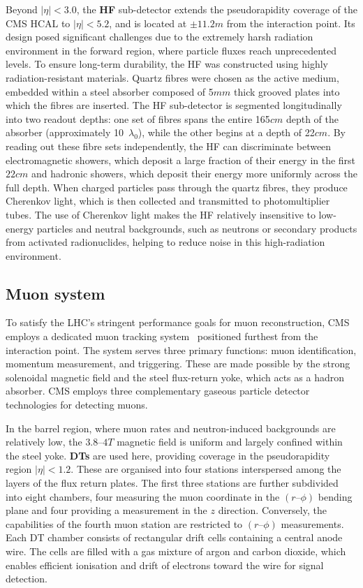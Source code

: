 Beyond $|\eta| < 3.0$, the \textbf{HF} sub-detector extends the pseudorapidity coverage of the CMS HCAL to $|\eta| < 5.2$, and is located at $\pm 11.2\unit{m}$ from the interaction point. Its design posed significant challenges due to the extremely harsh radiation environment in the forward region, where particle fluxes reach unprecedented levels. To ensure long-term durability, the HF was constructed using highly radiation-resistant materials. Quartz fibres were chosen as the active medium, embedded within a steel absorber composed of 5$\unit{mm}$ thick grooved plates into which the fibres are inserted. The HF sub-detector is segmented longitudinally into two readout depths: one set of fibres spans the entire 165$\unit{cm}$ depth of the absorber (approximately 10~$\lambda_0$), while the other begins at a depth of 22$\unit{cm}$. By reading out these fibre sets independently, the HF can discriminate between electromagnetic showers, which deposit a large fraction of their energy in the first $22\unit{cm}$ and hadronic showers, which deposit their energy more uniformly across the full depth. When charged particles pass through the quartz fibres, they produce Cherenkov light, which is then collected and transmitted to photomultiplier tubes. The use of Cherenkov light makes the HF relatively insensitive to low-energy particles and neutral backgrounds, such as neutrons or secondary products from activated radionuclides, helping to reduce noise in this high-radiation environment.

\subsection{Muon system}
To satisfy the LHC’s stringent performance goals for muon reconstruction, CMS employs a dedicated muon tracking system~\cite{LHC_CMS,CMS_Muon_System_Performance} positioned furthest from the interaction point. The system serves three primary functions: muon identification, momentum measurement, and triggering. These are made possible by the strong solenoidal magnetic field and the steel flux-return yoke, which acts as a hadron absorber.  CMS employs three complementary gaseous particle detector technologies for detecting muons.  

In the barrel region, where muon rates and neutron-induced backgrounds are relatively low, the $3.8–4\unit{T}$ magnetic field is uniform and largely confined within the steel yoke. \textbf{\ac{DTs}} are used here, providing coverage in the pseudorapidity region $|\eta| < 1.2$. These are organised into four stations interspersed among the layers of the flux return plates. The first three stations are further subdivided into eight chambers, four measuring the muon coordinate in the $(r–\phi)$ bending plane and four providing a measurement in the $z$ direction. Conversely, the capabilities of the fourth muon station are restricted to $(r–\phi)$ measurements. Each DT chamber consists of rectangular drift cells containing a central anode wire. The cells are filled with a gas mixture of argon and carbon dioxide, which enables efficient ionisation and drift of electrons toward the wire for signal detection. 


